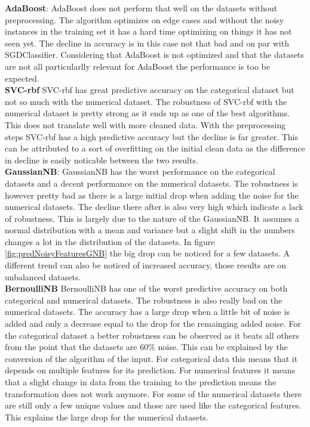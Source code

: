 \documentclass[a4paper,10pt]{article}
\begin{document}
\textbf{AdaBoost}: AdaBoost does not perform that well on the datasets without preprocessing. The algorithm optimizes on edge cases and without the noisy instances in the training set it has a hard time optimizing on things it has not seen yet. The decline in accuracy is in this case not that bad and on par with SGDClassifier. Considering that AdaBoost is not optimized and that the datasets are not all particularlly relevant for AdaBoost the performance is too be expected.\\

\textbf{SVC-rbf} SVC-rbf has great predictive accuracy on the categorical dataset but not so much with the numerical dataset. The robustness of SVC-rbf with the numerical dataset is pretty strong as it ends up as one of the best algorithms. This does not translate well with more cleaned data. With the preprocessing steps SVC-rbf has a high predictive accuracy but the decline is far greater. This can be attributed to a sort of overfitting on the initial clean data as the difference in decline is easily noticable between the two results. \\

\textbf{GaussianNB}: GaussianNB has the worst performance on the categorical datasets and a decent performance on the numerical datasets. The robustness is however pretty bad as there is a large initial drop when adding the noise for the numerical datasets. The decline there after is also very high which indicate a lack of robustness. This is largely due to the nature of the GaussianNB. It assumes a normal distribution with a mean and variance but a slight shift in the numbers changes a lot in the distribution of the datasets. In figure \ref{fig:predNoisyFeaturesGNB} the big drop can be noticed for a few datasets. A different trend can also be noticed of increased accuracy, those results are on unbalanced datasets. \\

\textbf{BernoulliNB} BernoulliNB has one of the worst predictive accuracy on both categorical and numerical datasets. The robustness is also really  bad on the numerical datasets. The accuracy has a large drop when a little bit of noise is added and only a decrease equal to the drop for the remainging added noise. For the categorical dataset a better robustness can be observed as it beats all others from the point that the datasets are 60$\%$ noise. This can be explained by the conversion of the algorithm of the input. For categorical data this means that it depends on multiple features for its prediction. For numerical features it means that a slight change in data from the training to the prediction means the transformation does not work anymore. For some of the numerical datasets there are still only a few unique values and those are used like the categorical features. This explains the large drop for the numerical datasets.  \\
\end{document}
